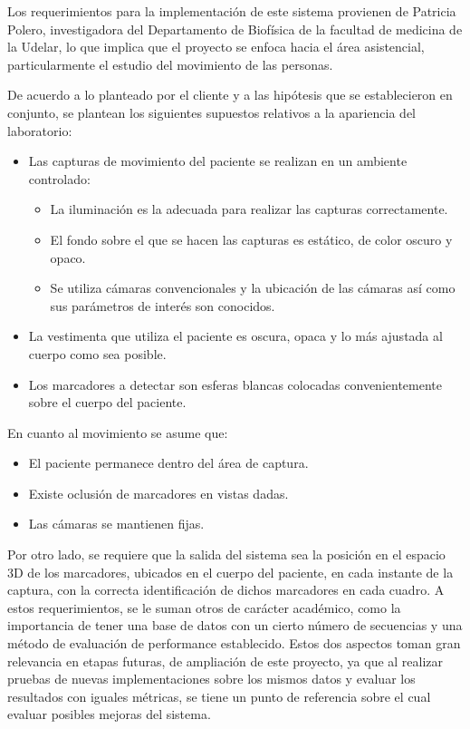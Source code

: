 Los requerimientos para la implementación de este sistema provienen de Patricia Polero, investigadora del Departamento de Biofísica de la facultad de medicina de la Udelar, lo que implica que el proyecto se enfoca hacia el área asistencial, particularmente el estudio del movimiento de las personas.

De acuerdo a lo planteado por el cliente y a las hipótesis que se establecieron en conjunto, se plantean los siguientes supuestos relativos a la apariencia del laboratorio:
\begin{itemize}
\item Las capturas de movimiento del paciente se realizan en un ambiente controlado:\vspace{-0.2cm}
	\begin{itemize}
		 \item La iluminación es la adecuada para realizar las  capturas correctamente.
		 \item El fondo sobre el que se hacen las capturas es estático, de color oscuro y opaco.		 
		 \item Se utiliza cámaras convencionales y la ubicación de las cámaras así como sus parámetros de interés son conocidos.
	\end{itemize}
	\vspace{-0.2cm}
\item La vestimenta que utiliza el paciente es oscura, opaca y lo más ajustada al cuerpo como sea posible.\vspace{-0.1cm}
\item Los marcadores a detectar son esferas blancas colocadas convenientemente sobre el cuerpo del paciente.
\end{itemize}

En cuanto al movimiento se asume que:
\begin{itemize}
\item El paciente permanece dentro del área de captura.\vspace{-0.1cm}
\item Existe oclusión de marcadores en vistas dadas.\vspace{-0.1cm}
\item Las cámaras se mantienen fijas.
\end{itemize}

Por otro lado, se requiere que la salida del sistema sea la posición en el espacio 3D de los marcadores, ubicados en el cuerpo del paciente, en cada instante de la captura, con la correcta identificación de dichos marcadores en cada cuadro. A estos requerimientos, se le suman otros de carácter académico, como la importancia de tener una base de datos con un cierto número de secuencias y una método de evaluación de performance establecido. Estos dos aspectos toman gran relevancia en etapas futuras, de ampliación de este proyecto, ya que al realizar pruebas  de nuevas implementaciones sobre los mismos datos y evaluar los resultados con iguales métricas, se tiene un punto de referencia sobre el cual evaluar posibles mejoras del sistema.

